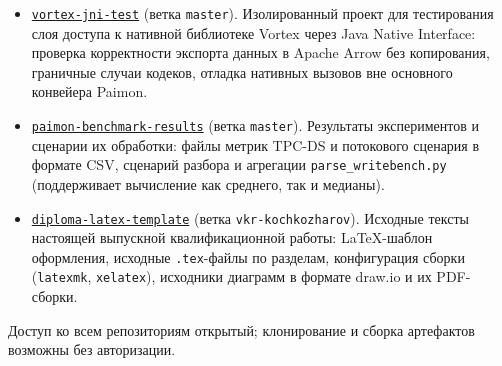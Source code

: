\begin{itemize}
    \item \href{https://github.com/mai-diploma-kochkozharov/vortex-jni-test}{\texttt{vortex-jni-test}}
        (ветка \texttt{master}). Изолированный проект для тестирования слоя
        доступа к нативной библиотеке Vortex через Java Native Interface:
        проверка корректности экспорта данных в Apache Arrow без копирования,
        граничные случаи кодеков, отладка нативных вызовов вне основного
        конвейера Paimon.

    \item \href{https://github.com/mai-diploma-kochkozharov/paimon-benchmark-results}{\texttt{paimon-benchmark-results}}
        (ветка \texttt{master}). Результаты экспериментов и сценарии их обработки:
        файлы метрик TPC-DS и потокового сценария в формате CSV, сценарий разбора
        и агрегации \texttt{parse\_writebench.py} (поддерживает вычисление как
        среднего, так и медианы).

    \item \href{https://github.com/mai-diploma-kochkozharov/diploma-latex-template}{\texttt{diploma-latex-template}}
        (ветка \texttt{vkr-kochkozharov}). Исходные тексты настоящей выпускной
        квалификационной работы: \LaTeX-шаблон оформления, исходные
        \texttt{.tex}-файлы по разделам, конфигурация сборки (\texttt{latexmk},
        \texttt{xelatex}), исходники диаграмм в формате draw.io и их PDF-сборки.
\end{itemize}

Доступ ко всем репозиториям открытый; клонирование и сборка артефактов возможны
без авторизации.
